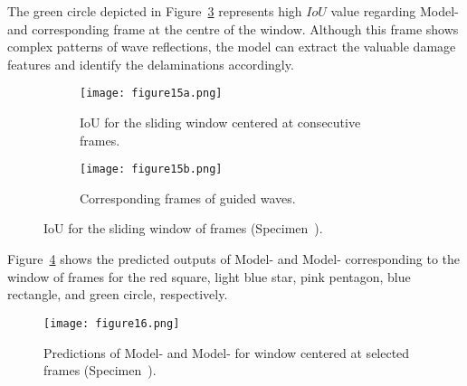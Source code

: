 The green circle depicted in 
Figure~\ref{fig:L3_S4_B_333x333p_50kHz_5HC_IoU_centre_window} represents high 
\(IoU\) value regarding Model- and corresponding frame at the centre of 
the window.
Although this frame shows complex patterns of wave reflections, the model can extract the valuable damage features and identify the delaminations accordingly.
\begin{figure} [!h]
	\centering
	\begin{subfigure}[b]{0.5\textwidth}
		\centering
		\texttt{[image: figure15a.png]}
		\caption{\centering IoU for the sliding window centered at consecutive 
		frames.}
		\label{fig:L3_S4_B_333x333p_50kHz_5HC_IoU}
	\end{subfigure}
	\par\medskip
	\begin{subfigure}[b]{0.5\textwidth}
		\centering
		\texttt{[image: figure15b.png]}
		\caption{\centering Corresponding frames of guided waves.} 
		\label{fig:L3_S4_B_333x333p_50kHz_5HC_shapes_}
	\end{subfigure}
	\caption{IoU for the sliding window of frames (Specimen~).}
	\label{fig:L3_S4_B_333x333p_50kHz_5HC_IoU_centre_window}
\end{figure} 

Figure~\ref{fig:L3_S4_B_5HC_predictions} shows the predicted outputs of Model- and Model- corresponding to the window of frames for the red square, light blue star, pink pentagon, blue rectangle, and green circle, respectively.
\begin{figure}[!h]
	\centering
	\texttt{[image: figure16.png]}
	\caption{Predictions of Model- and Model- for window centered at selected frames (Specimen~).}
	\label{fig:L3_S4_B_5HC_predictions}
\end{figure}

